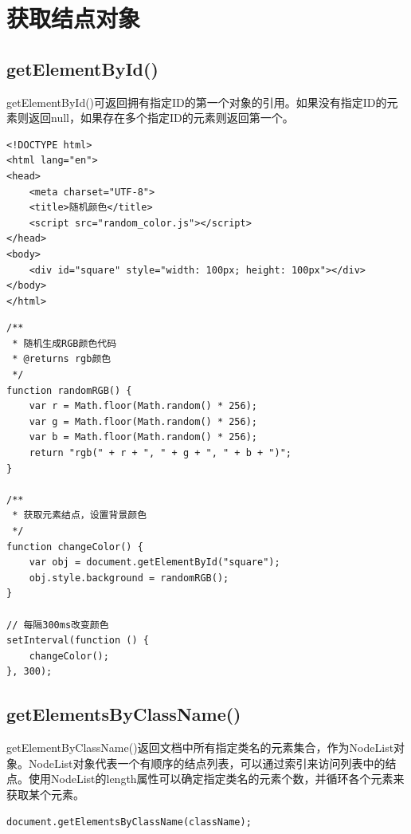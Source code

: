 \newpage

\section{获取结点对象}

\subsection{getElementById()}

getElementById()可返回拥有指定ID的第一个对象的引用。如果没有指定ID的元素则返回null，如果存在多个指定ID的元素则返回第一个。 \\


\begin{lstlisting}[style=htmlcssjs, title=random\_color.html]
<!DOCTYPE html>
<html lang="en">
<head>
    <meta charset="UTF-8">
    <title>随机颜色</title>
    <script src="random_color.js"></script>
</head>
<body>
    <div id="square" style="width: 100px; height: 100px"></div>
</body>
</html>
\end{lstlisting}

\begin{lstlisting}[style=htmlcssjs, title=random\_color.js]
/**
 * 随机生成RGB颜色代码
 * @returns rgb颜色
 */
function randomRGB() {
    var r = Math.floor(Math.random() * 256);
    var g = Math.floor(Math.random() * 256);
    var b = Math.floor(Math.random() * 256);
    return "rgb(" + r + ", " + g + ", " + b + ")";
}

/**
 * 获取元素结点，设置背景颜色
 */
function changeColor() {
    var obj = document.getElementById("square");
    obj.style.background = randomRGB();
}

// 每隔300ms改变颜色
setInterval(function () {
    changeColor();
}, 300);
\end{lstlisting}

\subsection{getElementsByClassName()}

getElementByClassName()返回文档中所有指定类名的元素集合，作为NodeList对象。NodeList对象代表一个有顺序的结点列表，可以通过索引来访问列表中的结点。使用NodeList的length属性可以确定指定类名的元素个数，并循环各个元素来获取某个元素。 \\

\begin{lstlisting}[style=htmlcssjs]
document.getElementsByClassName(className);
\end{lstlisting}

